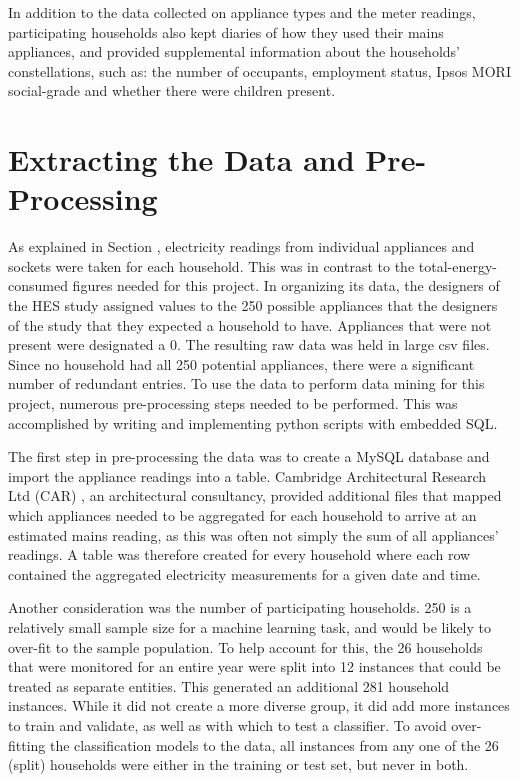 In addition to the data collected on appliance types and the meter readings, participating households also kept diaries of how they used their mains appliances, and provided supplemental information about the households' constellations, such as: the number of occupants, employment status, Ipsos MORI social-grade and whether there were children present.


\section{Extracting the Data and Pre-Processing}
\label{sec:preprocessing}

As explained in Section \mentionOfAggregationSection, electricity readings from individual appliances and sockets were taken for each household.  This was in contrast to the total-energy-consumed figures needed for this project. In organizing its data, the designers of the HES study assigned values to the 250 possible appliances that the designers of the study that they expected a household to have.  Appliances that were not present were designated a 0.  The resulting raw data was held in large csv files.  Since no household had all 250 potential appliances, there were a significant number of redundant entries. To use the data to perform data mining for this project, numerous pre-processing steps needed to be performed.  This was accomplished by writing and implementing python scripts with embedded SQL.

The first step in pre-processing the data was to create a MySQL database and import the appliance readings into a table. Cambridge Architectural Research Ltd (CAR) \cite{CARG_1} , an architectural consultancy, provided additional files that mapped which appliances needed to be aggregated for each household to arrive at an estimated mains reading, as this was often not simply the sum of all appliances' readings. A table was therefore created for every household where each row contained the aggregated electricity measurements for a given date and time. 

Another consideration was the number of participating households.  250 is a relatively small sample size for a machine learning task, and would be likely to over-fit to the sample population. To help account for this, the 26 households that were monitored for an entire year were split into 12 instances that could be treated as separate entities.  This generated an additional 281 household instances. While it did not create a more diverse group, it did add more instances to train and validate, as well as with which to test a classifier. To avoid over-fitting the classification models to the data, all instances from any one of the 26 (split) households were either in the training or test set, but never in both.

